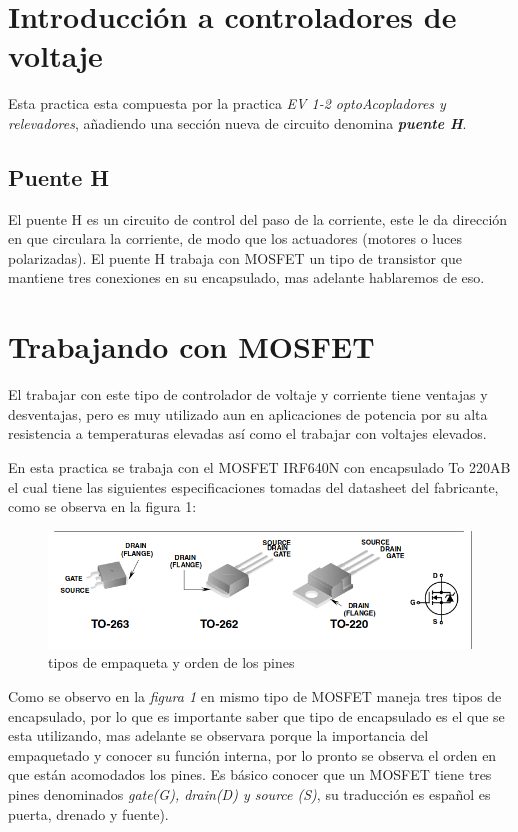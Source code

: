 \documentclass[11pt,a4paper]{article}
\begin{document}
\section{Introducción a controladores de voltaje}
Esta practica esta compuesta por la practica \emph{EV 1-2 optoAcopladores y relevadores}, añadiendo una sección nueva de circuito denomina \textbf{\emph{puente H}}.

\subsection{Puente H}

El puente H es un circuito de control del paso de la corriente, este le da dirección en que circulara la corriente, de modo que los actuadores (motores o luces polarizadas). El puente H trabaja con MOSFET un tipo de transistor que mantiene tres conexiones en su encapsulado, mas adelante hablaremos de eso.

\section{Trabajando con MOSFET}
El trabajar con este tipo de controlador de voltaje y corriente tiene ventajas y desventajas, pero es muy utilizado aun en aplicaciones de potencia por su alta resistencia a temperaturas elevadas así como el trabajar con voltajes elevados.

En esta practica se trabaja con el MOSFET IRF640N con encapsulado To 220AB el cual tiene las siguientes especificaciones tomadas del datasheet del fabricante, como se observa en la figura 1:


\begin{figure}[h]
\begin{center}
\includegraphics[scale=0.6]{2.png}
\caption{tipos de empaqueta y orden de los pines}
\end{center}
\end{figure}

\newpage

Como se observo en la \emph{figura 1} en mismo tipo de MOSFET maneja tres tipos de encapsulado, por lo que es importante saber que tipo de encapsulado es el que se esta utilizando, mas adelante se observara porque la importancia del empaquetado y conocer su función interna, por lo pronto se observa el orden en que están acomodados los pines. Es básico conocer que un MOSFET tiene tres pines denominados \emph{gate(G), drain(D) y source (S)}, su traducción es español es puerta, drenado y fuente).
\end{document}
